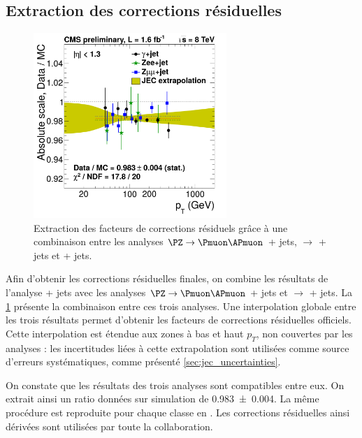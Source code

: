 \subsection{Extraction des corrections résiduelles}

\begin{figure}[p!]
  \centering
  \includegraphics[width=0.65\textwidth]{chapitre4/figs/jec_residuals_combined.pdf}
  \caption{Extraction des facteurs de corrections résiduels grâce à une combinaison entre les analyses $\PZ \rightarrow \Pmuon \APmuon$ + jets, \PZ $\rightarrow$ \Pelectron \APelectron + jets et \Pphoton + jets.}
  \label{fig:jec_residuals_combined}
\end{figure}


Afin d'obtenir les corrections résiduelles finales, on combine les résultats de l'analyse \Pphoton + jets avec les analyses $\PZ \rightarrow \Pmuon \APmuon$ + jets et \PZ $\rightarrow$ \Pelectron \APelectron + jets. La \cref{fig:jec_residuals_combined} présente la combinaison entre ces trois analyses. Une interpolation globale entre les trois résultats permet d'obtenir les facteurs de corrections résiduelles officiels. Cette interpolation est étendue aux zones à bas et haut $p_T$, non couvertes par les analyses : les incertitudes liées à cette extrapolation sont utilisées comme source d'erreurs systématiques, comme présenté \cref{sec:jec_uncertainties}.

\bigskip

On constate que les résultats des trois analyses sont compatibles entre eux. On extrait ainsi un ratio données sur simulation de \SI{0.983 \pm 0.004}{}. La même procédure est reproduite pour chaque classe en \aeta. Les corrections résiduelles ainsi dérivées sont utilisées par toute la collaboration.

